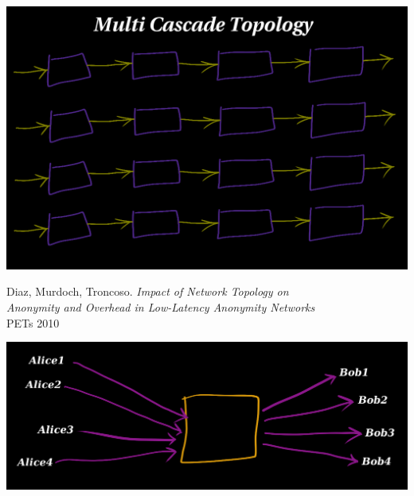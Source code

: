 \documentclass[fleqn,xcolor={usenames,dvipsnames}]{beamer} %
\begin{document}
\begin{frame}
\begin{center}
\includegraphics[scale=.29]{pics/multi_cascade}
\end{center}
\end{frame}


\begin{frame}
\hspace*{3pt} Diaz, Murdoch, Troncoso.  {\em Impact of Network Topology on \\
\hspace*{3pt} Anonymity and Overhead in Low-Latency Anonymity Networks} \\
\hspace*{3pt} PETs 2010
\end{frame}


\begin{frame}
\begin{center}
\includegraphics[scale=.24]{pics/sda1}
\end{center}
\end{frame}
\end{document}
